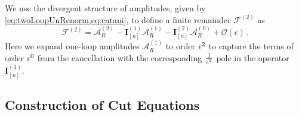 
We use the divergent structure of amplitudes, given by  \cref{eq:twoLoopUnRenorm,eq:catani},
to define a finite remainder $\mathcal{F}^{(2)}$ as
\begin{equation}\label{eq:remainderDef}
  \mathcal{F}^{(2)}=\mathcal{A}_R^{(2)}
  -\mathbf{I}_{[n]}^{(1)}\mathcal{A}_R^{(1)}
  -\mathbf{I}_{[n]}^{(2)}\mathcal{A}_R^{(0)}
  +\mathcal{O}(\epsilon)\,.
\end{equation}
Here we expand one-loop amplitudes $\mathcal{A}_R^{(1)}$ to order $\epsilon^2$ to capture the terms of order $\epsilon^0$
from the cancellation with the corresponding $\frac{1}{\epsilon^2}$ pole in the operator $\mathbf{I}_{[n]}^{(1)}$.


\subsection{Construction of Cut Equations}
\label{5parton:sec:tech}

